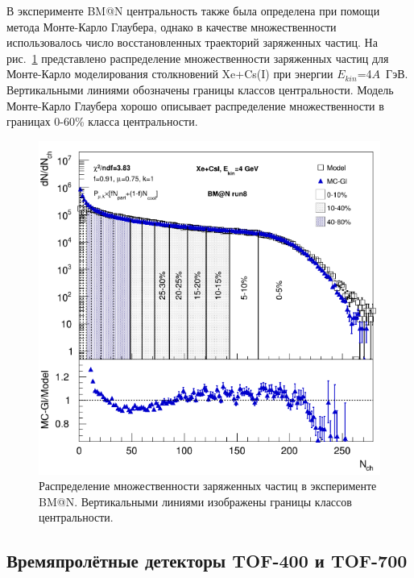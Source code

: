 В эксперименте BM@N центральность также была определена при помощи метода Монте-Карло Глаубера, однако в качестве множественности использовалось число восстановленных траекторий заряженных частиц.
На рис.~\ref{fig:bmn_multiplicity} представлено распределение множественности заряженных частиц для Монте-Карло моделирования столкновений Xe+Cs(I) при энергии $E_{kin}$=4$A$~ГэВ.
Вертикальными линиями обозначены границы классов центральности.
Модель Монте-Карло Глаубера хорошо описывает распределение множественности в границах 0-60\% класса центральности.
%
\begin{figure}[ht]
\begin{center}
\includegraphics[width=0.75\linewidth]{images/bmn_multiplicity.png}
\caption{Распределение множественности заряженных частиц в эксперименте BM@N. Вертикальными линиями изображены границы классов центральности.}
\label{fig:bmn_multiplicity}
\end{center}
\end{figure}

\subsection{Времяпролётные детекторы TOF-400 и TOF-700}

